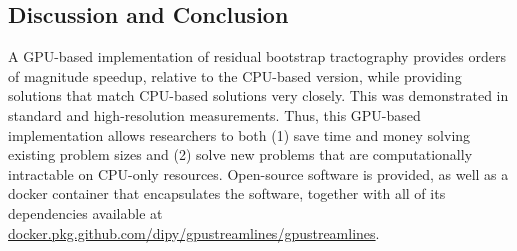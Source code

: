 \subsection{Discussion and Conclusion} 
A GPU-based implementation of residual bootstrap tractography provides orders of magnitude speedup, relative to the CPU-based version, while providing solutions that match CPU-based solutions very closely. This was demonstrated in standard and high-resolution measurements. Thus, this GPU-based implementation allows
researchers to both (1) save time and money solving existing problem
sizes and (2) solve new problems that are computationally intractable on
CPU-only resources. Open-source software is provided, as well as a
docker container that encapsulates the software, together with all of
its dependencies available at
\url{docker.pkg.github.com/dipy/gpustreamlines/gpustreamlines}.
